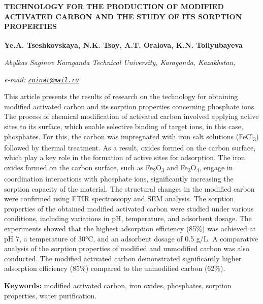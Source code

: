 \begin{articleheader}
{\bfseries TECHNOLOGY FOR THE PRODUCTION OF MODIFIED ACTIVATED CARBON AND THE STUDY OF ITS SORPTION PROPERTIES}

{\bfseries
Ye.A. Tseshkovskaya,
N.K. Tsoy\textsuperscript{\envelope },
A.T. Oralova,
K.N. Toilyubayeva}
\end{articleheader}

\begin{affiliation}
\emph{Abylkas Saginov Karaganda Technical University, Karaganda, Kazakhstan,}

\emph{e-mail: \href{mailto:zoinat@mail.ru}{\nolinkurl{zoinat@mail.ru}}}
\end{affiliation}

This article presents the results of research on the technology for
obtaining modified activated carbon and its sorption properties
concerning phosphate ions. The process of chemical modification of
activated carbon involved applying active sites to its surface, which
enable selective binding of target ions, in this case, phosphates. For
this, the carbon was impregnated with iron salt solutions
(FeCl\textsubscript{3}) followed by thermal treatment. As a result,
oxides formed on the carbon surface, which play a key role in the
formation of active sites for adsorption. The iron oxides formed on the
carbon surface, such as Fe\textsubscript{2}O\textsubscript{3} and
Fe\textsubscript{3}O\textsubscript{4}, engage in coordination
interactions with phosphate ions, significantly increasing the sorption
capacity of the material. The structural changes in the modified carbon
were confirmed using FTIR spectroscopy and SEM analysis. The sorption
properties of the obtained modified activated carbon were studied under
various conditions, including variations in pH, temperature, and
adsorbent dosage. The experiments showed that the highest adsorption
efficiency (85\%) was achieved at pH 7, a temperature of 30°C, and an
adsorbent dosage of 0.5 g/L. A comparative analysis of the sorption
properties of modified and unmodified carbon was also conducted. The
modified activated carbon demonstrated significantly higher adsorption
efficiency (85\%) compared to the unmodified carbon (62\%).

{\bfseries Keywords:} modified activated carbon, iron oxides, phosphates,
sorption properties, water purification.

